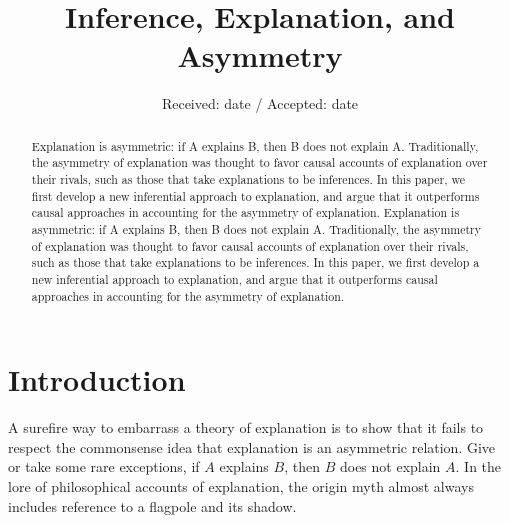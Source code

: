 \documentclass[natbib]{svjour3}                     %
\begin{document}
	\large
	\sloppy
	\title{Inference, Explanation, and Asymmetry
	}



\author{}


\institute{}

\date{Received: date / Accepted: date}

\raggedbottom

\maketitle
	
	\raggedbottom
	
	\maketitle
\begin{abstract}
	Explanation is asymmetric: if A explains B, then B does not explain A. Traditionally, the asymmetry of explanation was thought to favor causal accounts of explanation over their rivals, such as those that take explanations to be inferences. In this paper, we first develop a new inferential approach to explanation, and argue that it outperforms causal approaches in accounting for the asymmetry of explanation. Explanation is asymmetric: if A explains B, then B does not explain A. Traditionally, the asymmetry of explanation was thought to favor causal accounts of explanation over their rivals, such as those that take explanations to be inferences. In this paper, we first develop a new inferential approach to explanation, and argue that it outperforms causal approaches in accounting for the asymmetry of explanation.
\end{abstract}
\section{Introduction}
\label{sec:introduction}
A surefire way to embarrass a theory of explanation is to show that it fails to respect the commonsense idea that explanation is an asymmetric relation. Give or take some rare exceptions, if $A$ explains $B$, then $B$ does not explain $A$. In the lore of philosophical accounts of explanation, the origin myth almost always includes reference to a flagpole and its shadow. 
\end{document}
